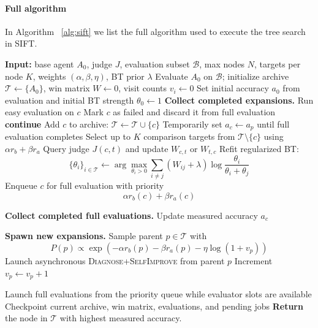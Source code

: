 \documentclass{article}
\begin{document}
\paragraph{Full algorithm}
In Algorithm ~\ref{alg:sift} we list the full algorithm used to execute the tree search in SIFT.
\begin{algorithm}[hbt!]
\caption{SIFT: Self-Improvement via Fast Tree Search}
\label{alg:sift}
\begin{algorithmic}[1]
\STATE \textbf{Input:} base agent $A_0$, judge $J$, evaluation subset $\mathcal{B}$, max nodes $N$, targets per node $K$, weights $(\alpha,\beta,\eta)$, BT prior $\lambda$
\STATE Evaluate $A_0$ on $\mathcal{B}$; initialize archive $\mathcal{T}\leftarrow\{A_0\}$, win matrix $W\leftarrow 0$, visit counts $v_i\leftarrow 0$
\STATE Set initial accuracy $a_0$ from evaluation and initial BT strength $\theta_0\leftarrow 1$
    \STATE \textbf{Collect completed expansions.}
        \STATE Run easy evaluation on $c$
            \STATE Mark $c$ as failed and discard it from full evaluation
            \STATE \textbf{continue}
        \ENDIF
        \STATE Add $c$ to archive: $\mathcal{T}\leftarrow \mathcal{T}\cup\{c\}$
        \STATE Temporarily set $a_c\leftarrow a_p$ until full evaluation completes
        \STATE Select up to $K$ comparison targets from $\mathcal{T}\setminus\{c\}$ using $\alpha r_{b}+\beta r_{a}$
            \STATE Query judge $J(c,t)$ and update $W_{c,t}$ or $W_{t,c}$
        \ENDFOR
        \STATE Refit regularized BT:
        \[
        \{\theta_i\}_{i\in\mathcal{T}}
        \leftarrow
        \arg\max_{\theta_i>0}
        \sum_{i\neq j}
        (W_{ij}+\lambda)
        \log
        \frac{\theta_i}{\theta_i+\theta_j}
        \]
        \STATE Enqueue $c$ for full evaluation with priority
        \[
        \alpha r_{b}(c)+\beta r_{a}(c)
        \]
    \ENDFOR

    \STATE \textbf{Collect completed full evaluations.}
        \STATE Update measured accuracy $a_c$
    \ENDFOR

    \STATE \textbf{Spawn new expansions.}
        \STATE Sample parent $p\in\mathcal{T}$ with
        \[
        P(p)
        \propto
        \exp\!\left(
        -\alpha r_{b}(p)
        -\beta r_{a}(p)
        -\eta\log(1+v_p)
        \right)
        \]
        \STATE Launch asynchronous \textsc{Diagnose+SelfImprove} from parent $p$
        \STATE Increment $v_p\leftarrow v_p+1$
    \ENDWHILE

    \STATE Launch full evaluations from the priority queue while evaluator slots are available
    \STATE Checkpoint current archive, win matrix, evaluations, and pending jobs
\ENDWHILE
\STATE \textbf{Return} the node in $\mathcal{T}$ with highest measured accuracy.
\end{algorithmic}
\end{algorithm}
\end{document}
